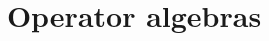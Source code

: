 



\title{Operator algebras}
\label{operatoralgebras}

\maketitle

\label{section-phantom}

\tableofcontents










